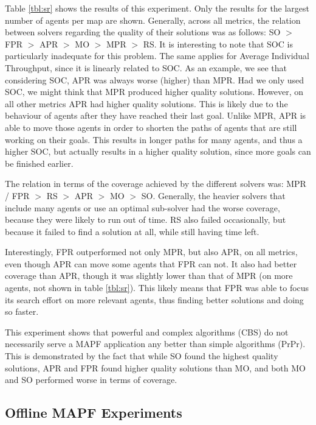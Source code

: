 \documentclass{article}
\newcommand{\soc}{SOC\xspace}
\newcommand{\indthr}{Average Individual Throughput\xspace}
\begin{document}
Table \ref{tbl:sr} shows the results of this experiment. Only the results for the largest number of agents per map are shown.
Generally, across all metrics, the relation between solvers regarding the quality of their solutions was as follows: SO $>$ FPR $>$ APR $>$ MO $>$ MPR $>$ RS. It is interesting to note that \soc is particularly inadequate for this problem. The same applies for \indthr, since it is linearly related to \soc. As an example, we see that considering \soc, APR was always worse (higher) than MPR. Had we only used \soc, we might think that MPR produced higher quality solutions. However, on all other metrics APR had higher quality solutions. This is likely due to the behaviour of agents after they have reached their last goal. Unlike MPR, APR is able to move those agents in order to shorten the paths of agents that are still working on their goals. This results in longer paths for many agents, and thus a higher \soc, but actually results in a higher quality solution, since more goals can be finished earlier. 

The relation in terms of the coverage achieved by the different solvers was: MPR / FPR $>$ RS $>$ APR $>$ MO $>$ SO. Generally, the heavier solvers that include many agents or use an optimal sub-solver had the worse coverage, because they were likely to run out of time. RS also failed occasionally, but because it failed to find a solution at all, while still having time left.

Interestingly, FPR outperformed not only MPR, but also APR, on all metrics, even though APR can move some agents that FPR can not. It also had better coverage than APR, though it was slightly lower than that of MPR (on more agents, not shown in table \ref{tbl:sr}). This likely means that FPR was able to focus its search effort on more relevant agents, thus finding better solutions and doing so faster.

This experiment shows that powerful and complex algorithms (CBS) do not necessarily serve a MAPF application any better than simple algorithms (PrPr). This is demonstrated by the fact that while SO found the highest quality solutions, APR and FPR found higher quality solutions than MO, and both MO and SO performed worse in terms of coverage.


\subsection{Offline MAPF Experiments}
\end{document}
